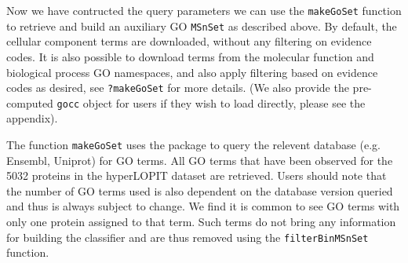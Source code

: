 \begin{knitrout}
\color{fgcolor}\begin{kframe}
\begin{alltt}
 \hlkwb{<-} \hlstd{(} \hlstd{=} \hlstd{(}\hlstd{,} \hlstd{))}
\end{alltt}
\end{kframe}
\end{knitrout}

Now we have contructed the query parameters we can use the
\texttt{makeGoSet} function to retrieve and build an auxiliary GO
\texttt{MSnSet} as described above. By default, the cellular component
terms are downloaded, without any filtering on evidence codes. It is
also possible to download terms from the molecular function and
biological process GO namespaces, and also apply filtering based on
evidence codes as desired, see \texttt{?makeGoSet} for more details.
(We also provide the pre-computed \texttt{gocc} object for users
if they wish to load directly, please see the appendix).

\begin{knitrout}
\color{fgcolor}\begin{kframe}
\begin{alltt}
 \hlkwb{<-}     \hlstd{=} \hlstd{)}
\end{alltt}
\end{kframe}
\end{knitrout}

The function \texttt{makeGoSet} uses the  package to
query the relevent database (e.g. Ensembl, Uniprot) for GO terms. All
GO terms that have been observed for the 5032 proteins in the
hyperLOPIT dataset are retrieved. Users should note that the number of
GO terms used is also dependent on the database version queried and
thus is always subject to change. We find it is common to see GO terms
with only one protein assigned to that term. Such terms do not bring
any information for building the classifier and are thus removed using
the \texttt{filterBinMSnSet} function.

\begin{knitrout}
\color{fgcolor}\begin{kframe}
\begin{alltt}
 \hlkwb{<-} 
\end{alltt}
\end{kframe}
\end{knitrout}

